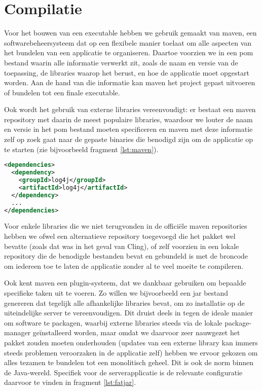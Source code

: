 \section{Compilatie}
\label{server:deployment:compilatie}

Voor het bouwen van een executable hebben we gebruik gemaakt van \ac{maven}, een softwarebeheersysteem dat op een flexibele manier toelaat om alle aspecten van het bundelen van een applicatie te organiseren. Daartoe voorzien we in een \ac{pom} bestand waarin alle informatie verwerkt zit, zoals de naam en versie van de toepassing, de libraries waarop het berust, en hoe de applicatie moet opgestart worden. Aan de hand van die informatie kan \ac{maven} het project gepast uitvoeren of bundelen tot een finale executable.

Ook wordt het gebruik van externe libraries vereenvoudigt: er bestaat een \ac{maven} repository met daarin de meest populaire libraries, waardoor we louter de naam en versie in het \ac{pom} bestand moeten specificeren en \ac{maven} met deze informatie zelf op zoek gaat naar de gepaste binaries die benodigd zijn om de applicatie op te starten (zie bijvoorbeeld fragment \ref{lst:maven}).

\begin{lstlisting}[language=XML, float, caption=Inladen van externe libraries via Maven., label=lst:maven]
<dependencies>
  <dependency>
    <groupId>log4j</groupId>
    <artifactId>log4j</artifactId>
  </dependency>
  ...
</dependencies>
\end{lstlisting}

Voor enkele libraries die we niet terugvonden in de officiële \ac{maven} repositories hebben we ofwel een alternatieve repository toegevoegd die het pakket wel bevatte (zoals dat was in het geval van Cling), of zelf voorzien in een lokale repository die de benodigde bestanden bevat en gebundeld is met de broncode om iedereen toe te laten de applicatie zonder al te veel moeite te compileren.

Ook kent \ac{maven} een plugin-systeem, dat we dankbaar gebruiken om bepaalde specifieke taken uit te voeren. Zo willen we bijvoorbeeld een \ac{jar} bestand genereren dat tegelijk alle afhankelijke libraries bevat, om zo installatie op de uiteindelijke server te vereenvoudigen. Dit druist deels in tegen de ideale manier om software te packagen, waarbij externe libraries steeds via de lokale package-manager geïnstalleerd worden, maar omdat we daarvoor zeer nauwgezet het pakket zouden moeten onderhouden (updates van een externe library kan immers steeds problemen veroorzaken in de applicatie zelf) hebben we ervoor gekozen om alles tezamen te bundelen tot een monolitisch geheel. Dit is ook de norm binnen de Java-wereld. Specifiek voor de serverapplicatie is de relevante configuratie daarvoor te vinden in fragment \ref{lst:fatjar}.


